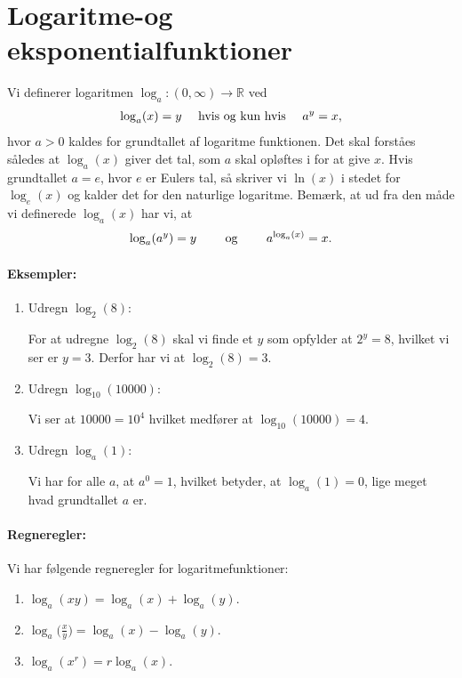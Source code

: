\section{Logaritme-og eksponentialfunktioner}
Vi definerer logaritmen $\log_a \colon (0,\infty) \to \mathbb{R}$ ved
\begin{align*}
\log_a(x) = y \quad \textup{ hvis og kun hvis } \quad a^y=x,
\end{align*}
hvor $a>0$ kaldes for grundtallet af logaritme funktionen. Det skal forståes således at $\log_a(x)$ giver det tal, som $a$ skal opløftes i for at give $x$. Hvis grundtallet $a=e$, hvor $e$ er Eulers tal, så skriver vi $\ln(x)$ i stedet for $\log_e(x)$ og kalder det for den naturlige logaritme. Bemærk, at ud fra den måde vi definerede $\log_a(x)$ har vi, at
\begin{align}\label{eq:funktioner4et}
\log_a(a^y)=y \qquad \textup{ og } \qquad a^{\log_a(x)}=x.
\end{align}

\paragraph*{Eksempler:}
\begin{enumerate}
\item Udregn $\log_2(8)$:

For at udregne $\log_2(8)$ skal vi finde et $y$ som opfylder at $2^y=8$, hvilket vi ser er $y=3$. Derfor har vi at $\log_2(8)=3$.
\item Udregn $\log_{10}(10000)$:

Vi ser at $10000=10^4$ hvilket medfører at $\log_{10}(10000)=4$.
\item Udregn $\log_a(1)$:

Vi har for alle $a$, at $a^0=1$, hvilket betyder, at $\log_a(1)=0$, lige meget hvad grundtallet $a$ er.
\end{enumerate}

\paragraph*{Regneregler:}
Vi har følgende regneregler for logaritmefunktioner:
\begin{enumerate}
\item $\log_a(xy)=\log_a(x)+\log_a(y)$.
\item $\log_a\big(\frac{x}{y}\big) = \log_a(x)-\log_a(y)$.
\item $\log_a(x^r) = r\log_a(x)$.
\end{enumerate}

